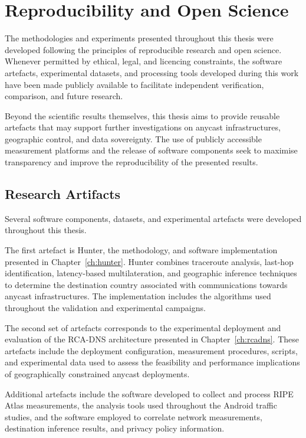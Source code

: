 \chapter{Reproducibility and Open Science}
\label{ch:reproducibility}

The methodologies and experiments presented throughout this thesis were developed following the principles of reproducible research and open science. Whenever permitted by ethical, legal, and licencing constraints, the software artefacts, experimental datasets, and processing tools developed during this work have been made publicly available to facilitate independent verification, comparison, and future research.

Beyond the scientific results themselves, this thesis aims to provide reusable artefacts that may support further investigations on anycast infrastructures, geographic control, and data sovereignty. The use of publicly accessible measurement platforms and the release of software components seek to maximise transparency and improve the reproducibility of the presented results.

\section{Research Artifacts}
\label{sc:reproducibility_artifacts}

Several software components, datasets, and experimental artefacts were developed throughout this thesis.

The first artefact is Hunter, the methodology, and software implementation presented in Chapter~\ref{ch:hunter}. Hunter combines traceroute analysis, last-hop identification, latency-based multilateration, and geographic inference techniques to determine the destination country associated with communications towards anycast infrastructures. The implementation includes the algorithms used throughout the validation and experimental campaigns.

The second set of artefacts corresponds to the experimental deployment and evaluation of the RCA-DNS architecture presented in Chapter~\ref{ch:rcadns}. These artefacts include the deployment configuration, measurement procedures, scripts, and experimental data used to assess the feasibility and performance implications of geographically constrained anycast deployments.

Additional artefacts include the software developed to collect and process RIPE Atlas measurements, the analysis tools used throughout the Android traffic studies, and the software employed to correlate network measurements, destination inference results, and privacy policy information.

